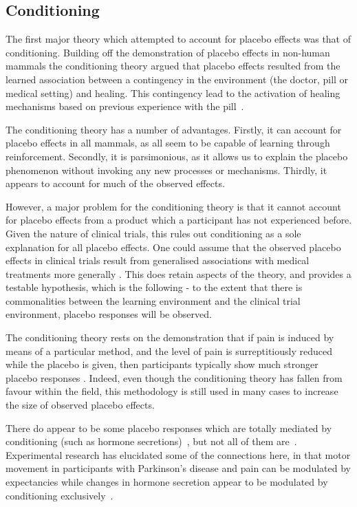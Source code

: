 \subsection{Conditioning}
\label{sec:conditioning}

The first major theory which attempted to account for placebo effects was that of conditioning. Building off the demonstration of placebo effects in non-human mammals \cite{Herrnstein1962} the conditioning theory argued that placebo effects resulted from the learned association between a contingency in the environment (the doctor, pill or medical setting) and healing. This contingency lead to the activation of healing mechanisms based on previous experience with the pill~\cite{Vodouris1989,Voudouris1985}.

The conditioning theory has a number of advantages. Firstly, it can account for placebo effects in all mammals, as all seem to be capable of learning through reinforcement. Secondly, it is parsimonious, as it allows us to explain the placebo phenomenon without invoking any new processes or mechanisms. Thirdly, it appears to account for much of the observed effects. 

However, a major problem for the conditioning theory is that it cannot account for placebo effects from a product which a participant  has not experienced before. Given the nature of clinical trials, this rules out   conditioning as a sole explanation for all placebo effects.  One could assume that the observed placebo effects in clinical trials result from generalised associations with medical treatments more generally \cite{pearce1987model}. This does retain aspects of the theory, and provides a testable hypothesis, which is the following - to the extent that there is commonalities between the learning environment and the clinical trial environment, placebo responses will be observed.  

The conditioning theory rests on the demonstration that if pain is induced by means of a particular method, and the level of pain is surreptitiously reduced while the placebo is given, then participants typically show much stronger placebo responses \cite{Voudouris1985,Colloca2006}. Indeed, even though the conditioning theory has fallen from favour within the field, this methodology is still used in many cases to increase the size of observed placebo effects. 


There do appear to be some placebo responses which are totally mediated by conditioning (such as hormone secretions)~\cite{Amanzio1999}, but not all of them are~\cite{benedetti2003a}. Experimental research has elucidated some of the connections here, in that motor movement in participants with Parkinson's disease and pain can be modulated by expectancies while changes in hormone secretion appear to be modulated by conditioning exclusively~\cite{benedetti2003a}.

